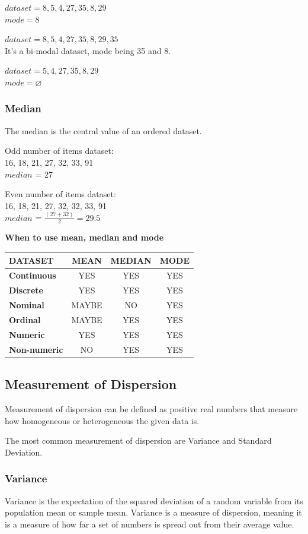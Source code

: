 \documentclass{article}
\begin{document}
$dataset = 8, 5, 4, 27, 35, 8, 29$ \\ 
$mode = 8$

$dataset = 8, 5, 4, 27, 35, 8, 29, 35$ \\ 
It’s a bi-modal dataset, mode being 35 and 8.

$dataset =  5, 4, 27, 35, 8, 29$ \\ 
$mode = \varnothing $

\subsubsection{Median}
The median is the central value of an ordered dataset.

Odd number of items dataset: \\
16, 18, 21, 27, 32, 33, 91 \\
$median$ = 27

Even number of items dataset: \\
16, 18, 21, 27, 32, 32, 33, 91 \\
$median$ = $\frac{(27 + 32)}{2} = 29.5$ 

\textbf{When to use mean, median and mode}

\begin{center}
\begin{tabular}{|l|c|c|c|}
\hline
DATASET & MEAN & MEDIAN & MODE \\ \hline
\textbf{Continuous} & YES & YES & YES \\ 
\textbf{Discrete} & YES & YES & YES \\ 
\textbf{Nominal} & MAYBE & NO & YES \\
\textbf{Ordinal} & MAYBE & YES & YES \\
\textbf{Numeric} & YES & YES & YES \\
\textbf{Non-numeric} & NO & YES & YES \\ 
\hline
\end{tabular}
\end{center}

\subsection{Measurement of Dispersion}
Measurement of dispersion can be defined as positive real numbers that measure how homogeneous or heterogeneous the given data is. 

The most common measurement of dispersion are Variance and Standard Deviation. 

\subsubsection{Variance}
Variance is the expectation of the squared deviation of a random variable from its population mean or sample mean. Variance is a measure of dispersion, meaning it is a measure of how far a set of numbers is spread out from their average value. 
\end{document}
